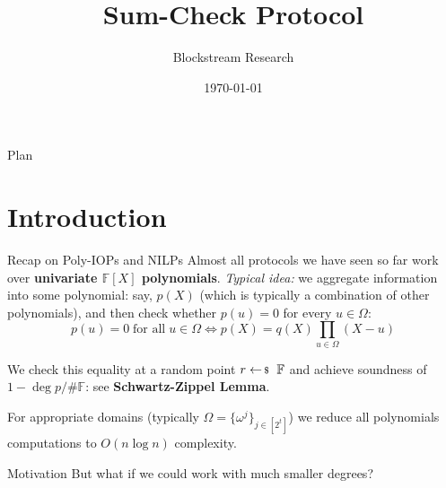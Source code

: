 \documentclass{zkdl-presentation-template}
\title[Sum-Check]{\textbf{Sum-Check Protocol}}
\author{Blockstream Research}
\date{\today}
\begin{document}
    \maketitleframe

    \begin{frame}{Plan}
        \tableofcontents
    \end{frame}

    \section{Introduction}

    \begin{frame}{Recap on Poly-IOPs and NILPs}
        Almost all protocols we have seen so far work over \textbf{univariate
        $\mathbb{F}[X]$ polynomials}. \pause \textit{Typical idea:} we aggregate
        information into some polynomial: say, $p(X)$ (which is typically a
        combination of other polynomials), and then check whether $p(u)=0$
        for every $u \in \Omega$:\pause
        \begin{equation*}
            p(u) = 0 \; \text{for all} \; u \in \Omega \iff 
            p(X) = q(X)\prod_{u \in \Omega}(X-u)
        \end{equation*}
        \pause

        We check this equality at a random point $r \leftarrowS \mathbb{F}$
        and achieve soundness of $1-\deg p/\#\mathbb{F}$: see
        \textbf{Schwartz-Zippel Lemma}.\pause

        For appropriate domains (typically $\Omega = \{\omega^j\}_{j \in
        [2^t]}$) we reduce all polynomials computations to $O(n\log
        n)$ complexity.\pause

        \begin{alertblock}{Motivation}
            But what if we could work with much smaller degrees?
        \end{alertblock}
    \end{frame}
\end{document}
